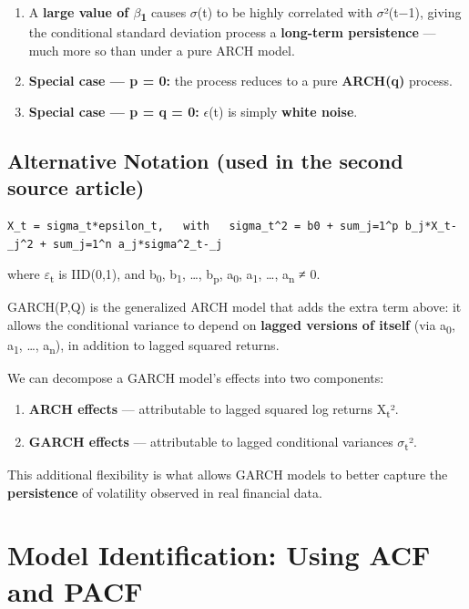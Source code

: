 \documentclass[12pt,openany]{book}
\theoremstyle{definition}
\theoremstyle{remark}
\begin{document}
\begin{enumerate}
\item A \textbf{large value of \ensuremath{\beta}\textsubscript{1}} causes \ensuremath{\sigma}(t) to be highly correlated with \ensuremath{\sigma}²(t−1), giving the conditional standard deviation process a \textbf{long-term persistence} — much more so than under a pure ARCH model.
\item \textbf{Special case — p = 0:} the process reduces to a pure \textbf{ARCH(q)} process.
\item \textbf{Special case — p = q = 0:} \ensuremath{\epsilon}(t) is simply \textbf{white noise}.
\end{enumerate}

\subsection{Alternative Notation (used in the second source article)}

\begin{lstlisting}[style=notesCode]
X_t = sigma_t*epsilon_t,   with   sigma_t^2 = b0 + sum_j=1^p b_j*X_t-_j^2 + sum_j=1^n a_j*sigma^2_t-_j
\end{lstlisting}

where \ensuremath{\varepsilon}\textsubscript{t} is IID(0,1), and
b\textsubscript{0}, b\textsubscript{1}, …, b\textsubscript{p},
a\textsubscript{0}, a\textsubscript{1}, …, a\textsubscript{n} ≠ 0.

GARCH(P,Q) is the generalized ARCH model that adds the extra term above: it
allows the conditional variance to depend on \textbf{lagged versions of
itself} (via a\textsubscript{0}, a\textsubscript{1}, …,
a\textsubscript{n}), in addition to lagged squared returns.

We can decompose a GARCH model's effects into two components:
\begin{enumerate}
\item \textbf{ARCH effects} — attributable to lagged squared log returns X\textsubscript{t}².
\item \textbf{GARCH effects} — attributable to lagged conditional variances \ensuremath{\sigma}\textsubscript{t}².
\end{enumerate}

This additional flexibility is what allows GARCH models to better capture the \textbf{persistence} of volatility observed in real financial data.


\section{Model Identification: Using ACF and PACF}
\end{document}
